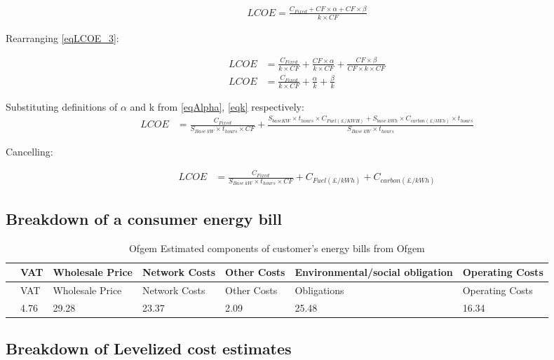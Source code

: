 \documentclass[11pt]{article}
\numberwithin{equation}{section}
\begin{document}
\begin{align}
\label{eqLCOE_3}
LCOE = \frac{C_{Fixed} +CF\times \alpha +CF\times \beta}{k\times CF}
\end{align}

Rearranging \ref{eqLCOE_3}:

\begin{align}
\label{eqLCOE_3}
LCOE &= \frac{C_{Fixed}}{k\times CF}+\frac{CF\times \alpha}{k\times CF}+ \frac{CF\times \beta}{CF \times k\times CF}  \\
LCOE &= \frac{C_{Fixed}}{k\times CF}+\frac{\alpha}{k} + \frac{\beta}{k}
\end{align}

Substituting definitions of \(\alpha\) and k from \ref{eqAlpha}, \ref{eqk} respectively:
\begin{align}
\label{eqLCOE_4}
LCOE &= \frac{C_{Fixed}}{S_{Base\; kW} \times t_{hours}\times CF}+\frac{S_{base KW}\times t_{hours} \times C_{Fuel(\pounds/KWH)}+ S_{base\;kWh} \times C_{carbon (\pounds/kWh)} \times t_{hours}
}{S_{Base\; kW} \times t_{hours}}
\end{align}

Cancelling:

\begin{align}
\label{eqLCOE_5}
LCOE &= \frac{C_{Fixed}}{S_{Base\; kW} \times t_{hours}\times CF}+ C_{Fuel(\pounds/kWh)} + C_{carbon(\pounds/kWh)}
\end{align}

\subsection{Breakdown of a consumer energy bill}
\label{sec:org8345ddc}

\begin{table}[H]
\caption{\label{tabBillBreakdown}Ofgem Estimated components of customer's energy bills from Ofgem \cite{ofgemBillBreakdown}}
\centering
\footnotesize
\begin{tabular}{lllllll}
\toprule
 & VAT & Wholesale Price & Network Costs & Other Costs & Environmental/social obligation & Operating Costs\\
\midrule
 & VAT & Wholesale Price & Network Costs & Other Costs & Obligations & Operating Costs\\
 & 4.76 & 29.28 & 23.37 & 2.09 & 25.48 & 16.34\\
\bottomrule
\end{tabular}
\end{table}
\subsection{Breakdown of Levelized cost estimates}
\label{sec:org5edda79}
\end{document}
